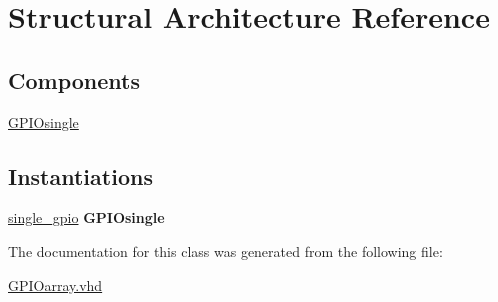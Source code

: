 \hypertarget{class_g_p_i_oarray_1_1_structural}{\section{Structural Architecture Reference}
\label{class_g_p_i_oarray_1_1_structural}
}
\subsection*{Components}
 \begin{DoxyCompactItemize}
\item 
\hypertarget{class_g_p_i_oarray_1_1_structural_ga1ef3f8a153dc3cf7c70b202d716ca7af}{\hyperlink{group__my_g_p_i_o_ga1ef3f8a153dc3cf7c70b202d716ca7af}{G\+P\+I\+Osingle}  {\bfseries }  }\label{class_g_p_i_oarray_1_1_structural_ga1ef3f8a153dc3cf7c70b202d716ca7af}

\end{DoxyCompactItemize}
\subsection*{Instantiations}
 \begin{DoxyCompactItemize}
\item 
\hypertarget{class_g_p_i_oarray_1_1_structural_ada2b130a1b666efc29e68e8f9f429d43}{\hyperlink{class_g_p_i_oarray_1_1_structural_ada2b130a1b666efc29e68e8f9f429d43}{single\+\_\+gpio}  {\bfseries G\+P\+I\+Osingle}   }\label{class_g_p_i_oarray_1_1_structural_ada2b130a1b666efc29e68e8f9f429d43}

\end{DoxyCompactItemize}


The documentation for this class was generated from the following file\+:\begin{DoxyCompactItemize}
\item 
\hyperlink{_g_p_i_oarray_8vhd}{G\+P\+I\+Oarray.\+vhd}\end{DoxyCompactItemize}
